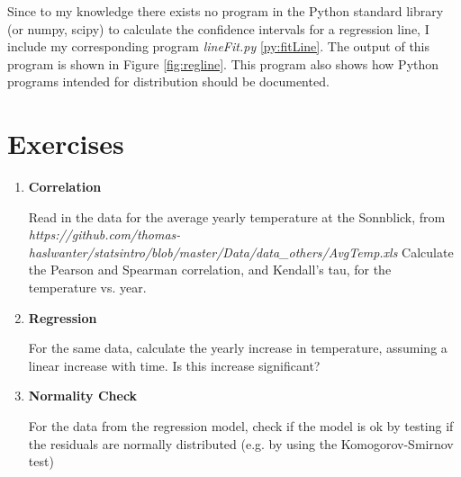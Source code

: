 Since to my knowledge there exists no program in the Python standard library (or numpy, scipy) to calculate the confidence intervals for a regression line, I include my corresponding program \emph{lineFit.py} \ref{py:fitLine}. The output of this program is shown in Figure \ref{fig:regline}. This program also shows how Python programs intended for distribution should be documented.



\section{Exercises}

\begin{enumerate}
  \item \textbf{Correlation}

    Read in the data for the average yearly temperature at the Sonnblick, from     \emph{https://github.com/thomas-haslwanter/statsintro/blob/master/Data/data\_others/AvgTemp.xls}
    Calculate the Pearson and Spearman correlation, and Kendall's tau, for the temperature vs. year.

  \item \textbf{Regression}

    For the same data, calculate the yearly increase in temperature, assuming a linear increase with time.
    Is this increase significant?

  \item \textbf{Normality Check}

    For the data from the regression model, check if the model is ok by testing if the residuals are normally distributed (e.g. by using the Komogorov-Smirnov test)

\end{enumerate}


